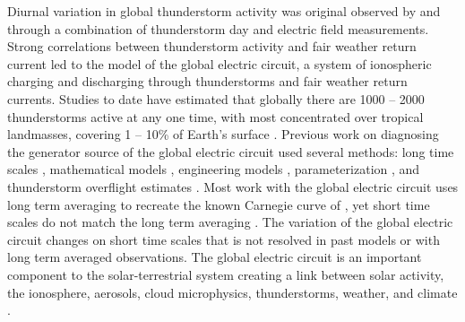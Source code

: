 Diurnal variation in global thunderstorm activity was original observed by \citet{Wilson1921} and \citet{Whipple1929} through a combination of thunderstorm day and electric field measurements.
Strong correlations between thunderstorm activity and fair weather return current led to the model of the global electric circuit, a system of ionospheric charging and discharging through thunderstorms and fair weather return currents.
Studies to date have estimated that globally there are 1000 -- 2000 thunderstorms active at any one time, with most concentrated over tropical landmasses, covering 1 -- 10\% of Earth's surface \citep{Markson1978, Rycroft2011a, Singh2011a}.
Previous work on diagnosing the generator source of the global electric circuit used several methods:  long time scales \citep{Tinsley2007, Liu2010}, mathematical models \citep{Kasemir1977, Hays1979, Roble1991}, engineering models \citep{Ogawa1985, Kartalev2004, Rycroft2006}, parameterization \citep{Price1992, Williams1985}, and thunderstorm overflight estimates \citep{Mach2011}.
Most work with the global electric circuit uses long term averaging to recreate the known Carnegie curve of \citet{Whipple1929}, yet short time scales do not match the long term averaging \citep{Holzworth1984a}.
The variation of the global electric circuit changes on short time scales that is not resolved in past models or with long term averaged observations.
The global electric circuit is an important component to the solar-terrestrial system creating a link between solar activity, the ionosphere, aerosols, cloud microphysics, thunderstorms, weather, and climate \citep{Tinsley2007, Holzworth1986}.


